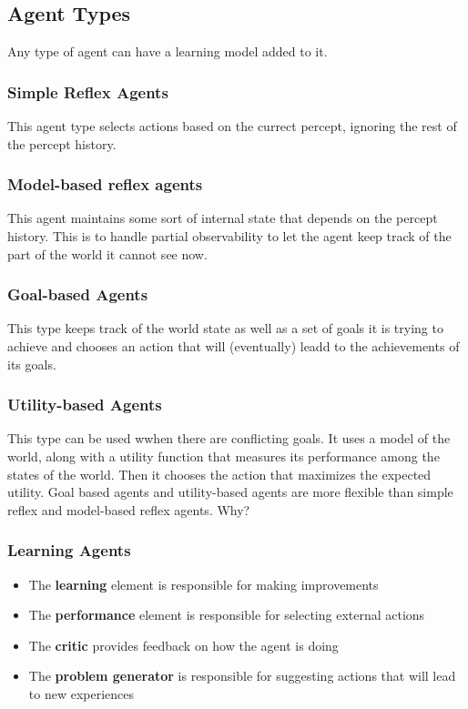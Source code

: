 \documentclass[12pt]{article}
\begin{document}
\pagebreak

\subsection{Agent Types}

Any type of agent can have a learning model added to it.

\subsubsection{Simple Reflex Agents}

This agent type selects actions based on the currect percept, ignoring the rest of the percept history.

\subsubsection{Model-based reflex agents}

This agent maintains some sort of internal state that depends on the percept history.
This is to handle partial observability to let the agent keep track of the part of the world it cannot see now.

\subsubsection{Goal-based Agents}

This type keeps track of the world state as well as a set of goals it is trying to achieve and chooses an action that will (eventually) leadd to the achievements of its goals.

\subsubsection{Utility-based Agents}

This type can be used wwhen there are conflicting goals. It uses a model of the world, along with a utility function that measures its performance among the states of the world.
Then it chooses the action that maximizes the expected utility.
Goal based agents and utility-based agents are more flexible than simple reflex and model-based reflex agents.
Why?

\subsubsection{Learning Agents}

\begin{itemize}
    \item The \textbf{learning} element is responsible for making improvements
    \item The \textbf{performance} element is responsible for selecting external actions
    \item The \textbf{critic} provides feedback on how the agent is doing
    \item The \textbf{problem generator} is responsible for suggesting actions that will lead to new experiences
\end{itemize}
\end{document}
